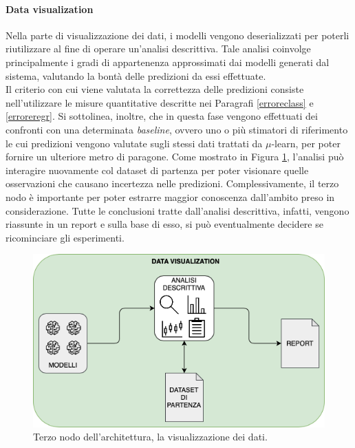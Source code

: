 \documentclass[12pt]{report}
\theoremstyle{definition}
\begin{document}
\paragraph{Data visualization} 
Nella parte di visualizzazione dei dati, i modelli vengono deserializzati per poterli riutilizzare al fine di operare un'analisi descrittiva.
Tale analisi coinvolge principalmente i gradi di appartenenza approssimati dai modelli generati dal sistema, valutando la bontà delle predizioni da essi effettuate.
\\
Il criterio con cui viene valutata la correttezza delle predizioni consiste nell'utilizzare le misure quantitative descritte nei Paragrafi \ref{erroreclass} e \ref{erroreregr}. Si sottolinea, inoltre, che in questa fase vengono effettuati dei confronti con una determinata \textit{baseline}, ovvero uno o più stimatori di riferimento le cui predizioni vengono valutate sugli stessi dati trattati da $\mu$-learn, per poter fornire un ulteriore metro di paragone. Come mostrato in Figura \ref{datavisualization}, l'analisi può interagire nuovamente col dataset di partenza per poter visionare quelle osservazioni che causano incertezza nelle predizioni. Complessivamente, il terzo nodo è importante per poter estrarre maggior conoscenza dall'ambito preso in considerazione. Tutte le conclusioni tratte dall'analisi descrittiva, infatti, vengono riassunte in un report e sulla base di esso, si può eventualmente decidere se ricominciare gli esperimenti.

\begin{figure}
    \centering
    \includegraphics[scale=0.6]{images/datavisualizationmodule.png}
    \caption{Terzo nodo dell'architettura, la visualizzazione dei dati.}
    \label{datavisualization}
\end{figure}
\end{document}
